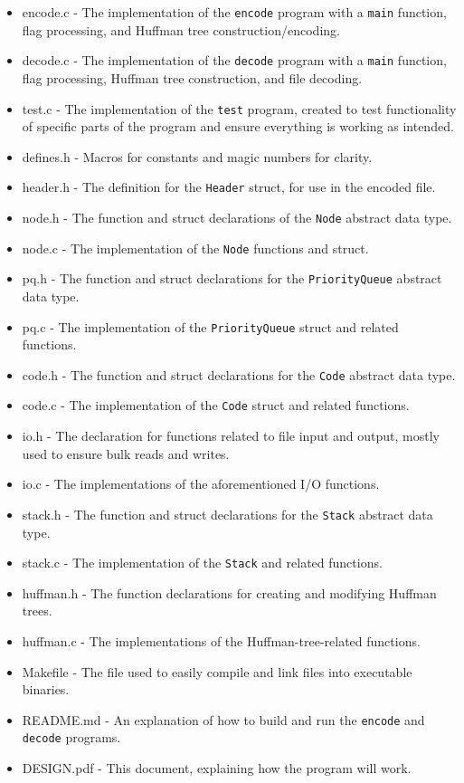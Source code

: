 \documentclass[12pt]{article}
\begin{document}
\begin{itemize}
    \item encode.c - The implementation of the \verb|encode| program with a \verb|main| function, flag processing, and Huffman tree construction/encoding.
    \item decode.c - The implementation of the \verb|decode| program with a \verb|main| function, flag processing, Huffman tree construction, and file decoding.
    \item test.c - The implementation of the \verb|test| program, created to test functionality of specific parts of the program and ensure everything is working as intended.
    \item defines.h - Macros for constants and magic numbers for clarity.
    \item header.h - The definition for the \verb|Header| struct, for use in the encoded file.
    \item node.h - The function and struct declarations of the \verb|Node| abstract data type.
    \item node.c - The implementation of the \verb|Node| functions and struct.
    \item pq.h - The function and struct declarations for the \verb|PriorityQueue| abstract data type.
    \item pq.c - The implementation of the \verb|PriorityQueue| struct and related functions.
    \item code.h - The function and struct declarations for the \verb|Code| abstract data type.
    \item code.c - The implementation of the \verb|Code| struct and related functions.
    \item io.h - The declaration for functions related to file input and output, mostly used to ensure bulk reads and writes.
    \item io.c - The implementations of the aforementioned I/O functions.
    \item stack.h - The function and struct declarations for the \verb|Stack| abstract data type.
    \item stack.c - The implementation of the \verb|Stack| and related functions.
    \item huffman.h - The function declarations for creating and modifying Huffman trees.
    \item huffman.c - The implementations of the Huffman-tree-related functions.
    \item Makefile - The file used to easily compile and link files into executable binaries.
    \item README.md - An explanation of how to build and run the \verb|encode| and \verb|decode| programs.
    \item DESIGN.pdf - This document, explaining how the program will work.
\end{itemize}
\end{document}
